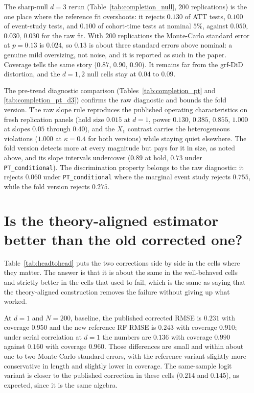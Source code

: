 \documentclass[11pt]{article}
\begin{document}
The sharp-null $d=3$ rerun (Table~\ref{tab:completion_null}, $200$
replications) is the one place where the reference fit overshoots: it rejects
$0.130$ of ATT tests, $0.100$ of event-study tests, and $0.100$ of cohort-time
tests at nominal $5\%$, against $0.050$, $0.030$, $0.030$ for the raw fit. With
$200$ replications the Monte-Carlo standard error at $p=0.13$ is $0.024$, so
$0.13$ is about three standard errors above nominal: a genuine mild
oversizing, not noise, and it is reported as such in the paper. Coverage tells
the same story ($0.87$, $0.90$, $0.90$). It remains far from the grf-DiD
distortion, and the $d=1,2$ null cells stay at $0.04$ to $0.09$.

The pre-trend diagnostic comparison (Tables~\ref{tab:completion_pt} and
\ref{tab:completion_pt_d3}) confirms the raw diagnostic and bounds the fold
version. The raw slope rule reproduces the published operating characteristics
on fresh replication panels (hold size $0.015$ at $d=1$, power $0.130$,
$0.385$, $0.855$, $1.000$ at slopes $0.05$ through $0.40$), and the $X_1$
contrast carries the heterogeneous violations ($1.000$ at $\kappa=0.4$ for both
versions) while staying quiet elsewhere. The fold version detects more at every
magnitude but pays for it in size, as noted above, and its slope intervals
undercover ($0.89$ at hold, $0.73$ under \texttt{PT\_conditional}). The
discrimination property belongs to the raw diagnostic: it rejects $0.060$
under \texttt{PT\_conditional} where the marginal event study rejects $0.755$,
while the fold version rejects $0.275$.

\section{Is the theory-aligned estimator better than the old corrected one?}
\label{sec:oldnew}

Table~\ref{tab:headtohead} puts the two corrections side by side in the cells where
they matter. The answer is that it is about the same in the well-behaved cells and
strictly better in the cells that used to fail, which is the same as saying that the
theory-aligned construction removes the failure without giving up what worked.

At $d=1$ and $N=200$, baseline, the published corrected RMSE is $0.231$ with coverage
$0.950$ and the new reference RF RMSE is $0.243$ with coverage $0.910$; under serial
correlation at $d=1$ the numbers are $0.136$ with coverage $0.990$ against $0.160$ with
coverage $0.960$. Those differences are small and within about one to two Monte-Carlo
standard errors, with the reference variant slightly more conservative in length and
slightly lower in coverage. The same-sample logit variant is closer to the published
correction in these cells ($0.214$ and $0.145$), as expected, since it is the same
algebra.
\end{document}
